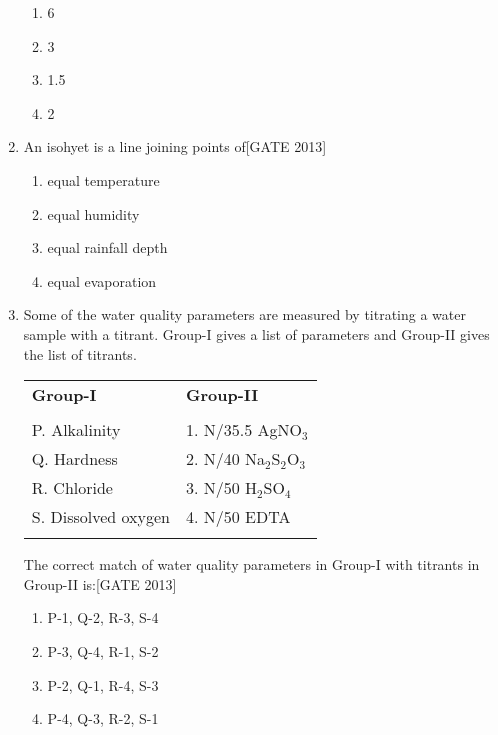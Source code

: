 \documentclass[journal,12pt,onecolumn]{IEEEtran}
\theoremstyle{remark}
\begin{document}
\begin{enumerate}
    \begin{multicols}{4}
    \begin{enumerate}
        \item 6
        \item 3
        \item 1.5
        \item 2
    \end{enumerate}
    \end{multicols}

    \item An isohyet is a line joining points of\hfill{[GATE 2013]}
    
    \begin{multicols}{2}
    \begin{enumerate}
        \item equal temperature
        \item equal humidity
        \item equal rainfall depth
        \item equal evaporation
    \end{enumerate}
    \end{multicols}

    \item Some of the water quality parameters are measured by titrating a water sample with a titrant. Group-I gives a list of parameters and Group-II gives the list of titrants.
    
    \begin{center}
    \begin{tabular}{ p{4cm} p{4cm}}
       
        \textbf{Group-I} & \textbf{Group-II} \\
       \\
        P. Alkalinity & 1. N/35.5 AgNO$_3$ \\
        Q. Hardness & 2. N/40 Na$_2$S$_2$O$_3$ \\
        R. Chloride & 3. N/50 H$_2$SO$_4$ \\
        S. Dissolved oxygen & 4. N/50 EDTA \\\\
       
    \end{tabular}
    \end{center}

    The correct match of water quality parameters in Group-I with titrants in Group-II is:\hfill{[GATE 2013]}
    
    \begin{multicols}{2}
    \begin{enumerate}
        \item P-1, Q-2, R-3, S-4
        \item P-3, Q-4, R-1, S-2
        \item P-2, Q-1, R-4, S-3
        \item P-4, Q-3, R-2, S-1
    \end{enumerate}
    \end{multicols}


\end{enumerate}
\end{document}

